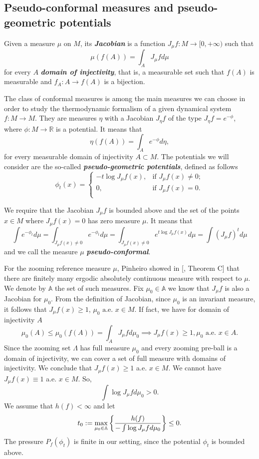 \documentclass[12pt,a4paper]{amsart}
\theoremstyle{plain}
\begin{document}
\subsection{Pseudo-conformal measures and pseudo-geometric potentials}
Given a measure $\mu$ on $M$, its \textbf{\textit{Jacobian}} is a function $J_{\mu}f : M \to [0,+ \infty)$ such that 
\[
\mu(f(A)) = \int_{A} J_{\mu}f d\mu
\] 
for every $A$ \textbf{\textit{domain of injectivity}}, that is, a measurable set such that $f(A)$ is measurable and $f_{A}: A \to f(A)$ is a bijection.

The class of conformal measures is among the main measures we can choose in order to study the thermodynamic formalism of a given dynamical system $f:M \to M$. They are measures $\eta$ with a Jacobian $J_{\eta}f$ of the type $J_{\eta}f = e^{-\phi}$, where $\phi: M \to \mathbb{R}$ is a potential. It means that 
\[
\eta(f(A)) = \int_{A} e^{-\phi} d\eta,
\]
for every measurable domain of injectivity $A \subset M$. The potentials we will consider are the so-called \textbf{\textit{pseudo-geometric potentials}}, defined as follows
\[
\phi_{t}(x) =
\begin{cases}
	-t \log J_{\mu}f(x), & \text{if }   J_{\mu}f(x) \neq 0;\\
	0 , & \text{if }  J_{\mu}f(x) = 0.\\
\end{cases}
\]

We require that the Jacobian $J_{\mu}f$ is bounded above and the set of the points $x \in M$ where $J_{\mu}f(x) = 0$ has zero measure $\mu$. It means that
\[
\int e^{-\phi_{t}} d\mu = \int_{J_{\mu}f(x) \neq 0} e^{-\phi_{t}} d\mu =  \int_{J_{\mu}f(x) \neq 0} e^{t \log J_{\mu}f(x)} d\mu = \int (J_{\mu}f)^{t} d\mu
\]
and we call the measure $\mu$ \textbf{\textit{pseudo-conformal}}.

For the zooming reference measure $\mu$, Pinheiro showed in [\cite{Pi1}, Theorem C] that there are finitely many ergodic absolutely continuous measure with respect to $\mu$. We denote by $\mathbb{A}$ the set of such measures. Fix $\mu_{0} \in \mathbb{A}$ we know that $J_{\mu}f$ is also a Jacobian for $\mu_{0}$. From the definition of Jacobian, since $\mu_{0}$ is an invariant measure, it follows that $J_{\mu}f(x) \geq 1$, $\mu_{0} \,\, \text{a.e.} \,\, x \in M$. If fact, we have for domain of injectivity $A$
\[
\mu_{0}(A) \leq  \mu_{0}(f(A))=  \int_{A} J_{\mu}f d\mu_{0} \implies J_{\mu}f(x) \geq 1, \mu_{0} \,\, \text{a.e.} \,\, x \in A. 
\]
Since the zooming set $\Lambda$ has full measure $\mu_{0}$ and every zooming pre-ball is a domain of injectivity, we can cover a set of full measure with domains of injectivity. We conclude that $J_{\mu} f(x) \geq 1$ a.e. $x \in M$. We cannot have $J_{\mu} f(x) \equiv 1$ a.e. $x \in M$. So,
\[
\displaystyle \int \log J_{\mu} f d\mu_{0} > 0.
\]
We assume that $h(f) < \infty$ and let
\[
\displaystyle t_{0} : = \max_{\mu_{0} \in \mathbb{A}} \bigg{\{} \frac{h(f)}{-\int \log J_{\mu} f d\mu_{0}} \bigg{\}} \leq 0.
\]
The pressure $P_{f}(\phi_{t})$ is finite in our setting, since the potential $\phi_{t}$ is bounded above.
\end{document}
